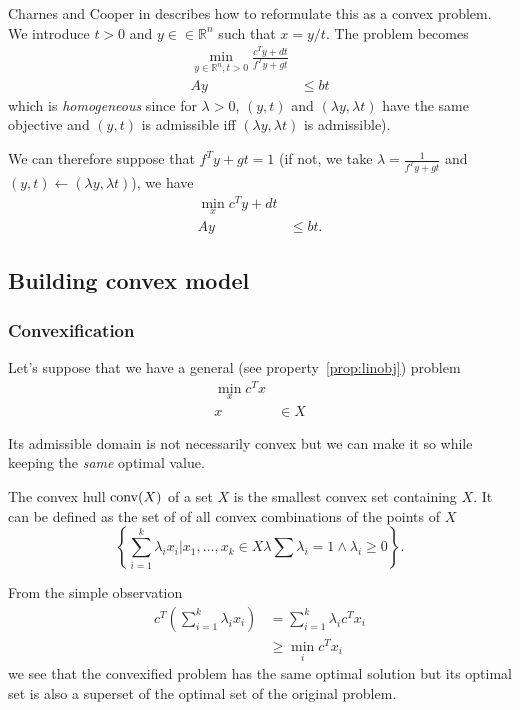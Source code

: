 Charnes and Cooper in \cite{charnes1985foundations} describes
how to reformulate this as a convex problem.
We introduce $t > 0$ and $y \in \in \mathbb{R}^n$
such that $x = y/t$.
The problem becomes
\begin{align*}
  \min_{y \in \mathbb{R}^n,t > 0} \frac{c^T y + dt}{f^T y + gt}\\
  Ay & \leq bt
\end{align*}
which is \emph{homogeneous} since for $\lambda > 0$,
$(y,t)$ and $(\lambda y, \lambda t)$ have the same objective
and $(y,t)$ is admissible iff $(\lambda y, \lambda t)$ is admissible).

We can therefore suppose that $f^T y + g t = 1$
(if not, we take $\lambda = \frac{1}{f^Ty + gt}$ and
$(y,t) \leftarrow (\lambda y, \lambda t)$), we have
\begin{align*}
  \min_x c^T y + dt\\
  Ay & \leq bt.
\end{align*}

\subsection{Building convex model}

\subsubsection{Convexification}
Let's suppose that we have a general (see property~\ref{prop:linobj}) problem
\begin{align*}
  \min_x c^T x\\
  x & \in X
\end{align*}

Its admissible domain is not necessarily convex but we can make it so while
keeping the \emph{same} optimal value.

\begin{mydef}
  The convex hull $\operatorname{conv}(X)$ of a set $X$ is the smallest convex set containing $X$.
  It can be defined as the set of of all convex combinations of the points of $X$
  \[ \left\{\sum_{i=1}^k \lambda_ix_i | x_1, \ldots, x_k \in X \lambda \sum \lambda_i = 1 \land \lambda_i \geq 0\right\}. \]
\end{mydef}
From the simple observation
\begin{align*}
  c^T\left(\sum_{i=1}^k \lambda_ix_i\right)
  & = \sum_{i=1}^k \lambda_i c^Tx_i\\
  & \geq \min_i c^Tx_i
\end{align*}
we see that the convexified problem has the same optimal solution but its optimal
set is also a superset of the optimal set of the original problem.

